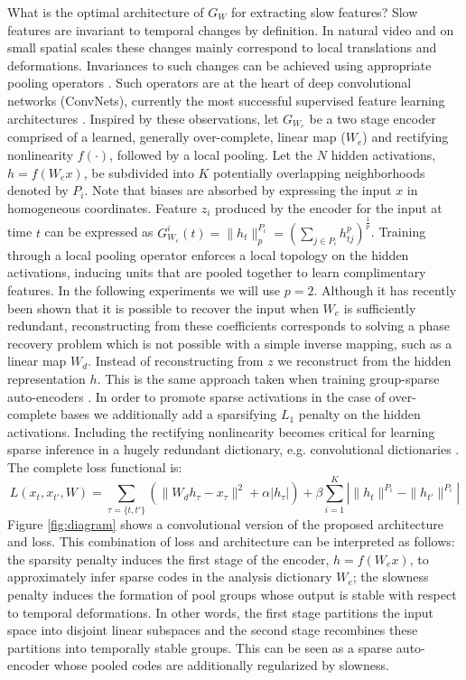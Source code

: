 What is the optimal architecture of $G_{W}$ for extracting slow features? Slow
features are invariant to temporal changes by definition. In natural video and
on small spatial scales these changes mainly correspond to local translations
and deformations. Invariances to such changes can be achieved using appropriate
pooling operators \cite{JoanScat,LeCun1998}.  Such operators are at the heart
of deep convolutional networks (ConvNets), currently the most successful
supervised feature learning architectures \cite{ImageNet}. Inspired by these
observations, let $G_{W_e}$ be a two stage encoder comprised of a learned,
generally over-complete, linear map ($W_e$) and rectifying nonlinearity
$f(\cdot)$, followed by a local pooling. Let the $N$ hidden activations, $h =
f(W_ex)$, be subdivided into $K$ potentially overlapping neighborhoods denoted
by $P_i$. Note that biases are absorbed by expressing the input $x$ in
homogeneous coordinates. Feature $z_i$ produced by the encoder for the input at
time $t$ can be expressed as $G_{W_e}^i(t) = \|h_t\|^{P_i}_p =\left(\sum_{j \in
P_i} h_{tj}^{p} \right)^{\frac{1}{p}}$. Training through a local pooling
operator enforces a local topology on the hidden activations, inducing units
that are pooled together to learn complimentary features. In the following
experiments we will use $p=2$. Although it has recently been shown that it is
possible to recover the input when $W_e$ is sufficiently redundant,
reconstructing from these coefficients corresponds to solving a phase recovery
problem \cite{JoanPooling} which is not possible with a simple inverse mapping,
such as a linear map $W_d$. Instead of reconstructing from $z$ we reconstruct
from the hidden representation $h$. This is the same approach taken when
training group-sparse auto-encoders \cite{groupSparsity}. In order to promote
sparse activations in the case of over-complete bases we additionally add a
sparsifying $L_1$ penalty on the hidden activations. Including the rectifying
nonlinearity becomes critical for learning sparse inference in a hugely
redundant dictionary, e.g. convolutional dictionaries \cite{LISTA}. The
complete loss functional is: \begin{equation} \label{eqn:loss} L(x_t,x_{t'},W)=
\sum_{\tau = \{t,t'\}} \left(\|W_d h_\tau - x_\tau\|^2 + \alpha|h_\tau|
\right)+\beta \sum_{i=1}^K \left| \|h_t \|^{P_i} - \|h_{t'}\|^{P_i} \right|
\end{equation} Figure \ref{fig:diagram} shows a convolutional version of the
proposed architecture and loss.  This combination of loss and architecture can
be interpreted as follows: the sparsity penalty induces the first stage of the
encoder, $h=f(W_ex)$, to approximately infer sparse codes in the analysis
dictionary $W_e$; the slowness penalty induces the formation of pool groups
whose output is stable with respect to temporal deformations. In other words,
the first stage partitions the input space into disjoint linear subspaces and
the second stage recombines these partitions into temporally stable groups.
This can be seen as a sparse auto-encoder whose pooled codes are additionally
regularized by slowness.

